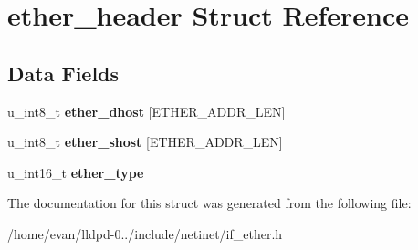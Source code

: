 \section{ether\-\_\-header \-Struct \-Reference}
\label{structether__header}
\subsection*{\-Data \-Fields}
\begin{DoxyCompactItemize}
\item 
u\-\_\-int8\-\_\-t {\bfseries ether\-\_\-dhost} [\-E\-T\-H\-E\-R\-\_\-\-A\-D\-D\-R\-\_\-\-L\-E\-N]\label{structether__header_a2254aa65c41a8b86e5265de1ccb33219}

\item 
u\-\_\-int8\-\_\-t {\bfseries ether\-\_\-shost} [\-E\-T\-H\-E\-R\-\_\-\-A\-D\-D\-R\-\_\-\-L\-E\-N]\label{structether__header_a230cbbab520fda0516f6ca5bfea0eab1}

\item 
u\-\_\-int16\-\_\-t {\bfseries ether\-\_\-type}\label{structether__header_a59724a5a470e6e4b73279b59ac5c27db}

\end{DoxyCompactItemize}


\-The documentation for this struct was generated from the following file\-:\begin{DoxyCompactItemize}
\item 
/home/evan/lldpd-\/0../include/netinet/if\-\_\-ether.\-h\end{DoxyCompactItemize}
